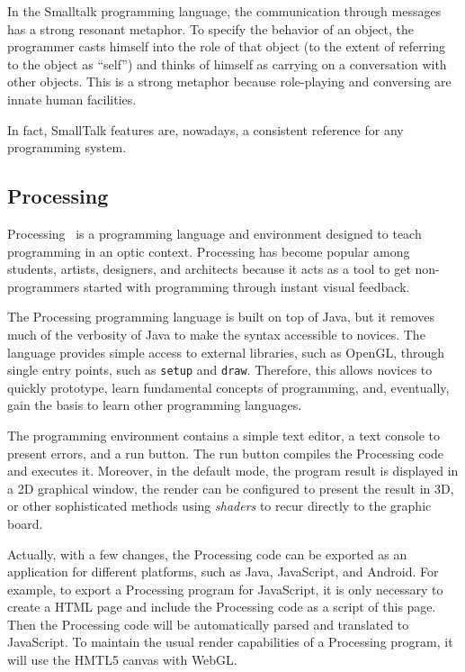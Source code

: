 In the Smalltalk programming language, the communication through messages has a strong resonant metaphor. To specify the behavior of an object, the programmer casts himself into the role of that object (to the extent of referring to the object as ``self'') and thinks of himself as carrying on a conversation with other objects. This is a strong metaphor because role-playing and conversing are innate human facilities. 

In fact, SmallTalk features are, nowadays, a consistent reference for any programming system.
\subsection{Processing}
\label{subsec:processing}
Processing~\citep{Reas2006} is a programming language and environment designed to teach programming in an optic context. Processing has become popular among students, artists, designers, and architects because it acts as a tool to get non-programmers started with programming through instant visual feedback.

The Processing programming language is built on top of Java, but it removes much of the verbosity of Java to make the syntax accessible to novices. The language provides simple access to external libraries, such as OpenGL, through single entry points, such as \texttt{setup} and \texttt{draw}. Therefore, this allows novices to quickly prototype, learn fundamental concepts of programming, and, eventually, gain the basis to learn other programming languages.

The programming environment contains a simple text editor, a text console to present errors, and a run button. The run button compiles the Processing code and executes it. Moreover, in the default mode, the program result is displayed in a 2D graphical window, the render can be configured to present the result in 3D, or other sophisticated methods using \textit{shaders} to recur directly to the graphic board.

Actually, with a few changes, the Processing code can be exported as an application for different platforms, such as Java, JavaScript, and Android. For example, to export a Processing program for JavaScript, it is only necessary to create a HTML page and include the Processing code as a script of this page. Then the Processing code will be automatically parsed and translated to JavaScript. To maintain the usual render capabilities of a Processing program, it will use the HMTL5 canvas with WebGL.

